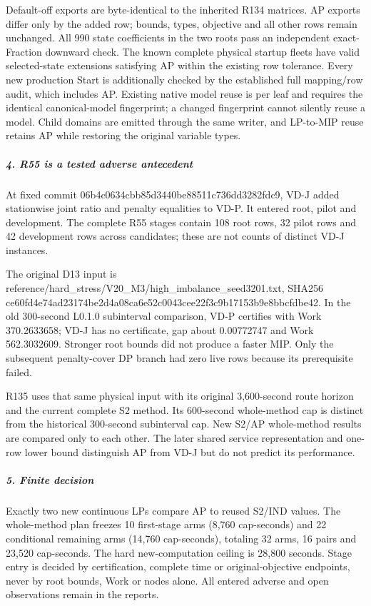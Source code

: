 \documentclass[
  american,
  11pt,
]{article}
\begin{document}
Default-off exports are byte-identical to the inherited R134 matrices.
AP exports differ only by the added row; bounds, types, objective and
all other rows remain unchanged. All 990 state coefficients in the two
roots pass an independent exact-Fraction downward check. The known
complete physical startup fleets have valid selected-state extensions
satisfying AP within the existing row tolerance. Every new production
Start is additionally checked by the established full mapping/row audit,
which includes AP. Existing native model reuse is per leaf and requires
the identical canonical-model fingerprint; a changed fingerprint cannot
silently reuse a model. Child domains are emitted through the same
writer, and LP-to-MIP reuse retains AP while restoring the original
variable types.

\subparagraph{4. R55 is a tested adverse
antecedent}\label{r55-is-a-tested-adverse-antecedent}

At fixed commit 06b4c063\allowbreak{}4cbb85d3\allowbreak{}440be885\allowbreak{}11c736dd\allowbreak{}3282fdc9, VD-J added
stationwise joint ratio and penalty equalities to VD-P. It entered root,
pilot and development. The complete R55 stages contain 108 root rows, 32
pilot rows and 42 development rows across candidates; these are not
counts of distinct VD-J instances.

The original D13 input is
reference/hard\_\allowbreak{}stress/V20\_\allowbreak{}M3/high\_\allowbreak{}imbalance\_\allowbreak{}seed3201.txt, SHA256
ce60fd4e\allowbreak{}74ad2317\allowbreak{}4be2d4a0\allowbreak{}8ca6e52c\allowbreak{}0043cee2\allowbreak{}2f3c9b17\allowbreak{}153b9e8b\allowbreak{}bcfdbe42. In the
old 300-second L0.1.0 subinterval comparison, VD-P certifies with Work
370.2633658; VD-J has no certificate, gap about 0.00772747 and Work
562.3032609. Stronger root bounds did not produce a faster MIP. Only the
subsequent penalty-cover DP branch had zero live rows because its
prerequisite failed.

R135 uses that same physical input with its original 3,600-second route
horizon and the current complete S2 method. Its 600-second whole-method
cap is distinct from the historical 300-second subinterval cap. New
S2/AP whole-method results are compared only to each other. The later
shared service representation and one-row lower bound distinguish AP
from VD-J but do not predict its performance.

\subparagraph{5. Finite decision}\label{finite-decision}

Exactly two new continuous LPs compare AP to reused S2/IND values. The
whole-method plan freezes 10 first-stage arms (8,760 cap-seconds) and 22
conditional remaining arms (14,760 cap-seconds), totaling 32 arms, 16
pairs and 23,520 cap-seconds. The hard new-computation ceiling is 28,800
seconds. Stage entry is decided by certification, complete time or
original-objective endpoints, never by root bounds, Work or nodes alone.
All entered adverse and open observations remain in the reports.
\end{document}
